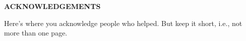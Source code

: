 
\newpage
\begin{center}
{\large \bf ACKNOWLEDGEMENTS}
\end{center}
Here’s where you acknowledge people who helped. But keep it short, i.e., not more than one page.